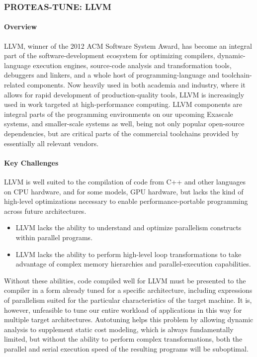 \subsubsection{ PROTEAS-TUNE: LLVM} 

\paragraph{Overview}

LLVM, winner of the 2012 ACM Software System Award, has become an integral part of the software-development ecosystem for optimizing compilers, dynamic-language execution engines, source-code analysis and transformation tools, debuggers and linkers, and a whole host of programming-language and toolchain-related components. Now heavily used in both academia and industry, where it allows for rapid development of production-quality tools, LLVM is increasingly used in work targeted at high-performance computing. LLVM components are integral parts of the programming environments on our upcoming Exascale systems, and smaller-scale systems as well, being not only popular open-source dependencies, but are critical parts of the commercial toolchains provided by essentially all relevant vendors.

\paragraph{Key Challenges}

LLVM is well suited to the compilation of code from C++ and other languages on CPU hardware, and for some models, GPU hardware, but lacks the kind of high-level optimizations necessary to enable performance-portable programming across future architectures.
\begin{itemize}
\item LLVM lacks the ability to understand and optimize parallelism constructs within parallel programs.
\item LLVM lacks the ability to perform high-level loop transformations to take advantage of complex memory hierarchies and parallel-execution capabilities.
\end{itemize}

Without these abilities, code compiled well for LLVM must be presented to the compiler in a form already tuned for a specific architecture, including expressions of parallelism suited for the particular characteristics of the target machine. It is, however, unfeasible to tune our entire workload of applications in this way for multiple target architectures. Autotuning helps this problem by allowing dynamic analysis to supplement static cost modeling, which is always fundamentally limited, but without the ability to perform complex transformations, both the parallel and serial execution speed of the resulting programs will be suboptimal.

